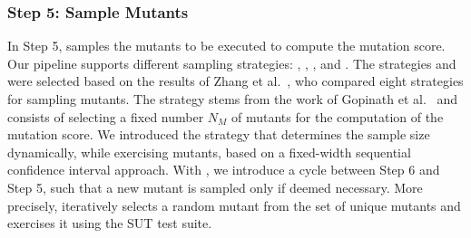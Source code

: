 {\subsubsection{Step 5: Sample Mutants}
\label{sec:codeDriven:samplingStep}
%
%
In Step 5, \MASS samples the mutants to be executed to compute the mutation score.
%
Our pipeline supports different sampling strategies: , ,  , and .
%
The strategies  and  were selected based on the results of Zhang et al.~\cite{zhang2013operator}, who compared eight strategies for sampling mutants.
%
The  strategy stems from the work of Gopinath et al.~\cite{gopinath2015hard} and consists of selecting a fixed number $N_M$ of mutants for the computation of the mutation score. 
%
We introduced the  strategy that determines the sample size dynamically, while exercising mutants, based on a fixed-width sequential confidence interval approach.
With , we introduce a cycle between Step 6 and Step 5, such that a new mutant is sampled only if deemed necessary.
 More precisely, \MASS iteratively selects a random mutant from the set of unique mutants and exercises it using the SUT test suite.
}
